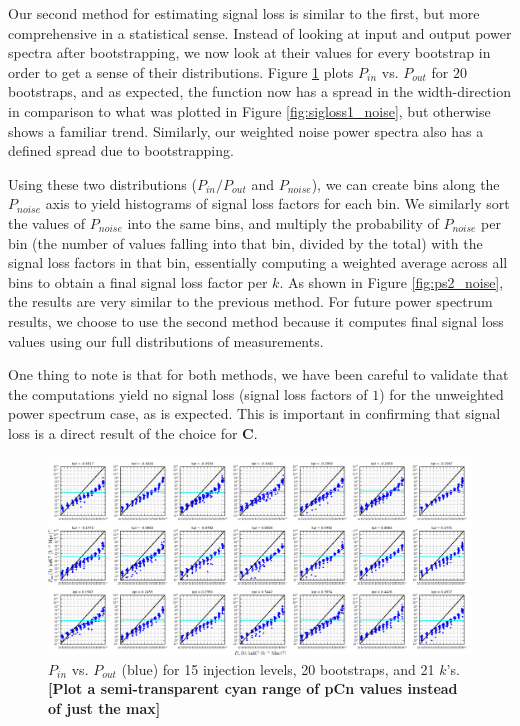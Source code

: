 \documentclass[preprint2,numberedappendix,tighten,twocolappendix]{aastex6}  %
\newcommand{\cc}[1]{{\color{purple} \textbf{[#1]}}}
\begin{document}
Our second method for estimating signal loss is similar to the first, but more comprehensive in a statistical sense. Instead of looking at input and output power spectra after bootstrapping, we now look at their values for every bootstrap in order to get a sense of their distributions. Figure \ref{fig:sigloss2_noise} plots $P_{in}$ vs. $P_{out}$ for $20$ bootstraps, and as expected, the function now has a spread in the width-direction in comparison to what was plotted in Figure \ref{fig:sigloss1_noise}, but otherwise shows a familiar trend. Similarly, our weighted noise power spectra also has a defined spread due to bootstrapping.

Using these two distributions ($P_{in}/P_{out}$ and $P_{noise}$), we can create bins along the $P_{noise}$ axis to yield histograms of signal loss factors for each bin. We similarly sort the values of $P_{noise}$ into the same bins, and multiply the probability of $P_{noise}$ per bin (the number of values falling into that bin, divided by the total) with the signal loss factors in that bin, essentially computing a weighted average across all bins to obtain a final signal loss factor per $k$. As shown in Figure \ref{fig:ps2_noise}, the results are very similar to the previous method. For future power spectrum results, we choose to use the second method because it computes final signal loss values using our full distributions of measurements.

One thing to note is that for both methods, we have been careful to validate that the computations yield no signal loss (signal loss factors of $1$) for the unweighted power spectrum case, as is expected. This is important in confirming that signal loss is a direct result of the choice for $\textbf{C}$.

\begin{figure}
	\centering
	\includegraphics[width=1.0\textwidth]{plots/sigloss2_noise.png}
	\caption{$P_{in}$ vs. $P_{out}$ (blue) for 15 injection levels, 20 bootstraps, and 21 $k$'s. \cc{Plot a semi-transparent cyan range of pCn values instead of just the max}}
	\label{fig:sigloss2_noise}
\end{figure}
\end{document}
